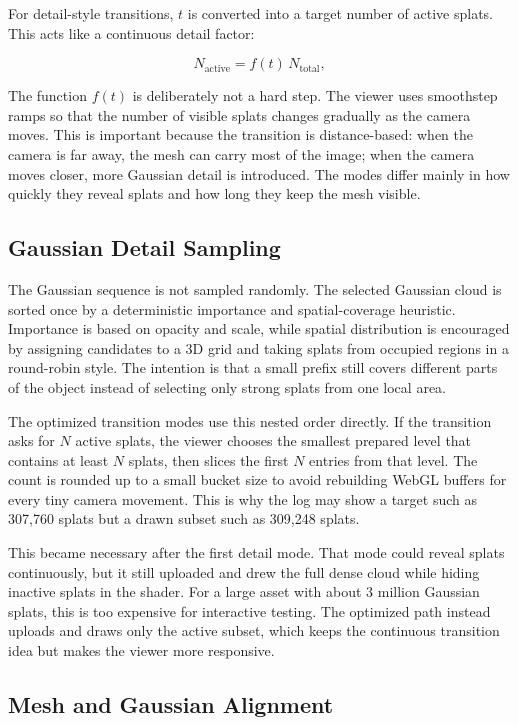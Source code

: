 \documentclass{egpubl}
\begin{document}
For detail-style transitions, $t$ is converted into a target number of active splats. This acts like a continuous detail factor:

\[
N_\mathrm{active} = f(t) \, N_\mathrm{total},
\]

The function $f(t)$ is deliberately not a hard step. The viewer uses smoothstep ramps so that the number of visible
splats changes gradually as the camera moves. This is important because the transition is distance-based: when the camera is far away,
the mesh can carry most of the image; when the camera moves closer, more Gaussian detail is introduced.
The modes differ mainly in how quickly they reveal splats and how long they keep the mesh visible.

\subsection{Gaussian Detail Sampling}

The Gaussian sequence is not sampled randomly. The selected Gaussian cloud is sorted once by a deterministic importance
and spatial-coverage heuristic. Importance is based on opacity and scale, while spatial distribution is encouraged by assigning
candidates to a 3D grid and taking splats from occupied regions in a round-robin style.
The intention is that a small prefix still covers different parts of the object instead of selecting only
strong splats from one local area.

The optimized transition modes use this nested order directly. If the transition asks for $N$ active splats,
the viewer chooses the smallest prepared level that contains at least $N$ splats, then slices the first $N$ entries from that level.
The count is rounded up to a small bucket size to avoid rebuilding WebGL buffers for every tiny camera movement.
This is why the log may show a target such as 307,760 splats but a drawn subset such as 309,248 splats.

This became necessary after the first detail mode. That mode could reveal splats continuously,
but it still uploaded and drew the full dense cloud while hiding inactive splats in the shader.
For a large asset with about 3 million Gaussian splats, this is too expensive for interactive testing.
The optimized path instead uploads and draws only the active subset, which keeps the continuous transition
idea but makes the viewer more responsive.

\subsection{Mesh and Gaussian Alignment}
\end{document}
